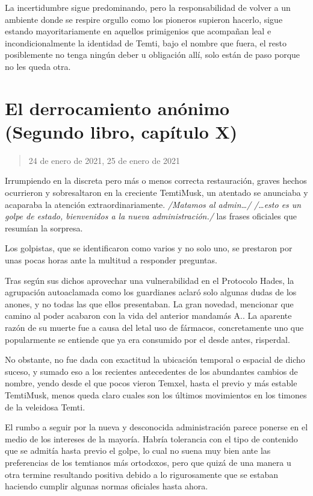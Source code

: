 \documentclass[
]{book}
\begin{document}
La incertidumbre sigue predominando, pero la responsabilidad de volver a un ambiente donde se respire orgullo como los pioneros supieron hacerlo, sigue estando mayoritariamente en aquellos primigenios que acompañan leal e incondicionalmente la identidad de Temti, bajo el nombre que fuera, el resto posiblemente no tenga ningún deber u obligación allí, solo están de paso porque no les queda otra.

\hypertarget{el-derrocamiento-anuxf3nimo-segundo-libro-capuxedtulo-x}{%
\section{El derrocamiento anónimo (Segundo libro, capítulo X)}\label{el-derrocamiento-anuxf3nimo-segundo-libro-capuxedtulo-x}}

\begin{quote}
24 de enero de 2021, 25 de enero de 2021
\end{quote}

Irrumpiendo en la discreta pero más o menos correcta restauración, graves hechos ocurrieron y sobresaltaron en la creciente TemtiMusk, un atentado se anunciaba y acaparaba la atención extraordinariamente. \emph{/Matamos al admin\ldots/} \emph{/\ldots esto es un golpe de estado, bienvenidos a la nueva administración./} las frases oficiales que resumían la sorpresa.

Los golpistas, que se identificaron como varios y no solo uno, se prestaron por unas pocas horas ante la multitud a responder preguntas.

Tras según sus dichos aprovechar una vulnerabilidad en el Protocolo Hades, la agrupación autoaclamada como los guardianes aclaró solo algunas dudas de los anones, y no todas las que ellos presentaban. La gran novedad, mencionar que camino al poder acabaron con la vida del anterior mandamás A.. La aparente razón de su muerte fue a causa del letal uso de fármacos, concretamente uno que popularmente se entiende que ya era consumido por el desde antes, risperdal.

No obstante, no fue dada con exactitud la ubicación temporal o espacial de dicho suceso, y sumado eso a los recientes antecedentes de los abundantes cambios de nombre, yendo desde el que pocos vieron Temxel, hasta el previo y más estable TemtiMusk, menos queda claro cuales son los últimos movimientos en los timones de la veleidosa Temti.

El rumbo a seguir por la nueva y desconocida administración parece ponerse en el medio de los intereses de la mayoría. Habría tolerancia con el tipo de contenido que se admitía hasta previo el golpe, lo cual no suena muy bien ante las preferencias de los temtianos más ortodoxos, pero que quizá de una manera u otra termine resultando positiva debido a lo rigurosamente que se estaban haciendo cumplir algunas normas oficiales hasta ahora.
\end{document}
